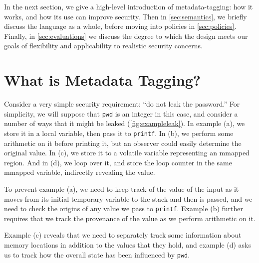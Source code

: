 \documentclass{llncs}
\begin{document}
In the next section, we give a high-level introduction of metadata-tagging: how it works,
and how its use can improve security. Then in \cref{sec:semantics}, we briefly discuss the
language as a whole, before moving into policies in \cref{sec:policies}. Finally, in
\cref{sec:evaluations} we discuss the degree to
which the design meets our goals of flexibility and applicability to realistic
security concerns.

\section{What is Metadata Tagging?}
  
Consider a very simple security requirement: ``do not leak the password.''
For simplicity, we will suppose that {\tt pwd} is an integer in this case, and consider
a number of ways that it might be leaked (\cref{fig:exampleleak}).
In example (a), we store it in a local variable, then pass it to {\tt printf}.
In (b), we perform some arithmetic on it before printing it, but an observer could
easily determine the original value. In (c), we store it to a volatile variable
representing an mmapped region. And in (d), we loop over it, and store the loop
counter in the same mmapped variable, indirectly revealing the value.

To prevent example (a), we need to keep track of the value of the input as it
moves from its initial temporary variable to the stack and then is passed, and
we need to check the origins of any value we pass to {\tt printf}. Example (b)
further requires that we track the provenance of the value as we perform arithmetic
on it.

Example (c) reveals that we need to separately track some information about memory
locations in addition to the values that they hold, and example (d) asks us to track
how the overall state has been influenced by {\tt pwd}.

\end{document}
